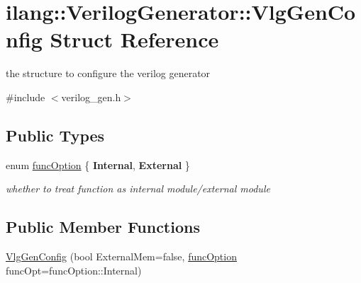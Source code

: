 \hypertarget{structilang_1_1_verilog_generator_1_1_vlg_gen_config}{}\section{ilang\+:\+:Verilog\+Generator\+:\+:Vlg\+Gen\+Config Struct Reference}
\label{structilang_1_1_verilog_generator_1_1_vlg_gen_config}


the structure to configure the verilog generator  




{\ttfamily \#include $<$verilog\+\_\+gen.\+h$>$}

\subsection*{Public Types}
\begin{DoxyCompactItemize}
\item 
\mbox{\label{structilang_1_1_verilog_generator_1_1_vlg_gen_config_aa081357e4c256bb0e0dca0d9f2bd9a96}} 
enum \mbox{\hyperlink{structilang_1_1_verilog_generator_1_1_vlg_gen_config_aa081357e4c256bb0e0dca0d9f2bd9a96}{func\+Option}} \{ {\bfseries Internal}, 
{\bfseries External}
 \}
\begin{DoxyCompactList}\small\item\em whether to treat function as internal module/external module \end{DoxyCompactList}\end{DoxyCompactItemize}
\subsection*{Public Member Functions}
\begin{DoxyCompactItemize}
\item 
\mbox{\hyperlink{structilang_1_1_verilog_generator_1_1_vlg_gen_config_a7e2941ee0336d21aefc24c1ec2ed6038}{Vlg\+Gen\+Config}} (bool External\+Mem=false, \mbox{\hyperlink{structilang_1_1_verilog_generator_1_1_vlg_gen_config_aa081357e4c256bb0e0dca0d9f2bd9a96}{func\+Option}} func\+Opt=func\+Option\+::\+Internal)
\end{DoxyCompactItemize}
